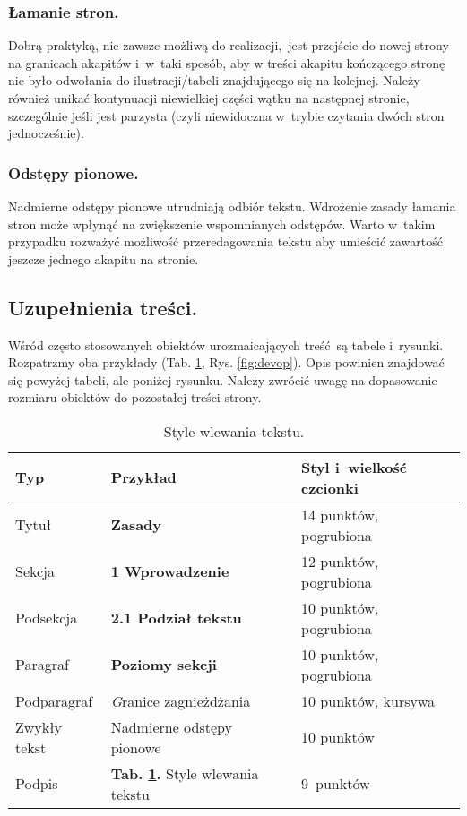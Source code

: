 \subsubsection{Łamanie stron.}
\label{subsubsec:pagebreak}

Dobrą praktyką, nie zawsze możliwą do realizacji, jest przejście do nowej strony na granicach akapitów i~w~taki sposób, aby w treści akapitu kończącego stronę nie było odwołania do ilustracji/tabeli znajdującego się na kolejnej. Należy również unikać kontynuacji niewielkiej części wątku na następnej stronie, szczególnie jeśli jest parzysta (czyli niewidoczna w~trybie czytania dwóch stron jednocześnie).

\subsubsection{Odstępy pionowe.}
\label{subsubsec:verticalSpace}

Nadmierne odstępy pionowe utrudniają odbiór tekstu. Wdrożenie zasady łamania stron może wpłynąć na zwiększenie wspomnianych odstępów. Warto w~takim przypadku rozważyć możliwość przeredagowania tekstu aby umieścić zawartość jeszcze jednego akapitu na stronie.

\subsection{Uzupełnienia treści.}
\label{subsec:additions}

Wśród często stosowanych obiektów urozmaicających treść są tabele i~rysunki. Rozpatrzmy oba przykłady (Tab. \ref{tab:styles}, Rys. \ref{fig:devop}). Opis powinien znajdować się powyżej tabeli, ale poniżej rysunku. Należy zwrócić uwagę na dopasowanie rozmiaru obiektów do pozostałej treści strony.

\begin{table}
	\vspace{-4mm}
	\caption{
		Style wlewania tekstu.
	}
	\begin{center}
		\begin{tabular}{lll}
			\hline
			Typ & Przykład & Styl i~wielkość czcionki\\
			\hline
			Tytuł & {\Large\bfseries Zasady} & 14 punktów, pogrubiona\\
			Sekcja &  {\large\bfseries 1 Wprowadzenie} & 12 punktów, pogrubiona\\
			Podsekcja & {\bfseries 2.1 Podział tekstu} & 10 punktów, pogrubiona\\
			Paragraf & {\bfseries Poziomy sekcji} & 10 punktów, pogrubiona\\
			Podparagraf & {\textit Granice zagnieżdżania} & 10 punktów, kursywa\\
			Zwykły tekst & Nadmierne odstępy pionowe & 10 punktów\\
			Podpis & {\small\textbf{Tab. \ref{tab:styles}.} Style wlewania tekstu} & 9~punktów\\
			\hline
		\end{tabular}
	\end{center}
	\label{tab:styles}
	\vspace{-6mm}
\end{table}

